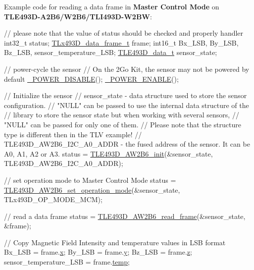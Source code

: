 Example code for reading a data frame in {\bfseries Master Control Mode} on {\bfseries T\+L\+E493\+D-\/\+A2\+B6/\+W2\+B6/\+T\+L\+I493\+D-\/\+W2\+BW}\+: ~\newline
 
\begin{DoxyCode}
\textcolor{comment}{// please note that the value of status should be checked and properly handler}
int32\_t status;
\mbox{\hyperlink{struct_t_lx493_d__data__frame__t}{TLx493D\_data\_frame\_t}} frame;
int16\_t Bx\_LSB, By\_LSB, Bz\_LSB, sensor\_temperature\_LSB;
\mbox{\hyperlink{struct_t_l_e493_d__data__t}{TLE493D\_data\_t}} sensor\_state;


\textcolor{comment}{// power-cycle the sensor}
\textcolor{comment}{// On the 2Go Kit, the sensor may not be powered by default}
\mbox{\hyperlink{interface_8h_abadb0076439c5df777bd4e545d82dcce}{\_POWER\_DISABLE}}();
\mbox{\hyperlink{interface_8h_a049c9e0574db2668751f73dcacaacfe7}{\_POWER\_ENABLE}}();

\textcolor{comment}{// Initialize the sensor}
\textcolor{comment}{// sensor\_state - data structure used to store the sensor configuration.}
\textcolor{comment}{//                "NULL" can be passed to use the internal data structure of the}
\textcolor{comment}{//                library to store the sensor state but when working with several sensors,}
\textcolor{comment}{//                "NULL" can be passed for only one of them.}
\textcolor{comment}{//                Please note that the structure type is different then in the TLV example!}
\textcolor{comment}{// TLE493D\_AW2B6\_I2C\_A0\_ADDR - the fused address of the sensor. It can be A0, A1, A2 or A3.}
status = \mbox{\hyperlink{_t_l_e___a_w2_b6_8h_ac24faf10a6ed531d3926901253ec420f}{TLE493D\_AW2B6\_init}}(&sensor\_state, TLE493D\_AW2B6\_I2C\_A0\_ADDR);

\textcolor{comment}{// set operation mode to Master Control Mode}
status = \mbox{\hyperlink{_t_l_e___a_w2_b6_8c_ac9472a655168a8594bfcfffbd7607149}{TLE493D\_AW2B6\_set\_operation\_mode}}(&sensor\_state, 
      TLx493D\_OP\_MODE\_MCM);

\textcolor{comment}{// read a data frame}
status = \mbox{\hyperlink{_t_l_e___a_w2_b6_8c_a2762d6c77af74f058687f66f2299825a}{TLE493D\_AW2B6\_read\_frame}}(&sensor\_state, &frame);

\textcolor{comment}{// Copy Magnetic Field Intensity and temperature values in LSB format}
Bx\_LSB = frame.\mbox{\hyperlink{struct_t_lx493_d__data__frame__t_ac9e9d1455533b3d2e417f2064982a31d}{x}};
By\_LSB = frame.\mbox{\hyperlink{struct_t_lx493_d__data__frame__t_a95882762f5a26aaed29610c8d4ed8b4c}{y}};
Bz\_LSB = frame.\mbox{\hyperlink{struct_t_lx493_d__data__frame__t_afc28475d31ed47440530c04d85958adb}{z}};
sensor\_temperature\_LSB = frame.\mbox{\hyperlink{struct_t_lx493_d__data__frame__t_a318d6cd91a330f561fd0bb7a36f555c8}{temp}};
\end{DoxyCode}


